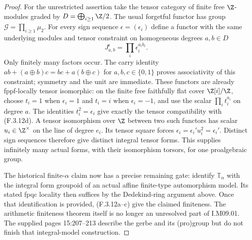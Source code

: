 \begin{proof}
For the unrestricted assertion take the tensor category of
finite free $\Z$-modules graded by
$D=\bigoplus_{i\ge1}\Z/2$. The usual forgetful functor has
group $\mathcal G=\prod_{i\ge1}\mu_2$. For every sign
sequence $\epsilon=(\epsilon_i)$ define a functor with the
same underlying modules and tensor constraint on homogeneous
degrees $a,b\in D$
\[
                 J^\epsilon_{a,b}
                     =\prod_i\epsilon_i^{a_i b_i}.
 \tag{F.3.12d}
\]
Only finitely many factors occur. The carry identity
$ab+(a\mathbin\oplus b)c=bc+a(b\mathbin\oplus c)$ for
$a,b,c\in\{0,1\}$ proves associativity of this constraint;
symmetry and the unit are immediate. These functors are
already fppf-locally tensor isomorphic: on the finite free
faithfully flat cover $\Z[i]/\Z$, choose $t_i=1$ when
$\epsilon_i=1$ and $t_i=i$ when $\epsilon_i=-1$, and use
the scalar $\prod_i t_i^{a_i}$ on degree $a$.
The identities $t_i^2=\epsilon_i$ give exactly the tensor
compatibility with (F.3.12d). A tensor isomorphism over
$\Z$ between two such functors has scalar
$u_i\in\Z^\times$ on the line of degree $e_i$. Its tensor
square forces $\epsilon_i=\epsilon_i' u_i^2=\epsilon_i'$.
Distinct sign sequences therefore give distinct integral
tensor forms. This supplies infinitely many actual forms,
with their isomorphism torsors, for one proalgebraic group.

The historical finite-$\alpha$ claim now has a precise
remaining gate: identify $\mathbb T_\alpha$ with the integral
form groupoid of an actual affine finite-type automorphism
model. Its stated fpqc locality then suffices by the
Dedekind-ring argument above. Once that identification is provided, (F.3.12a--c)
give the claimed finiteness. The arithmetic finiteness theorem
itself is no longer an unresolved part of I.M09.01. The
supplied pages 15:207--213 describe the gerbe and its
(pro)group but do not finish that integral-model construction.
\end{proof}

